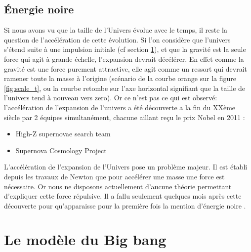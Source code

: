 \subsection{Énergie noire}
\label{sec:dark_egy}


Si nous avons vu que la taille de l'Univers évolue avec le temps, il reste la question de l'accélération de cette évolution.
Si l'on considère que l'univers s'étend suite à une impulsion initiale (cf section \ref{sec:BB}), et que la gravité est la seule force qui agit à grande échelle, l'expansion devrait décélérer.
En effet comme la gravité est une force purement attractive, elle agit comme un ressort qui devrait ramener toute la masse à l'origine (scénario de la courbe orange sur la figure \ref{fig:scale_t}, ou la courbe retombe sur l'axe horizontal signifiant que la taille de l'univers tend à nouveau vers zero).
Or ce n'est pas ce qui est observé: l'accélération de l'expansion de l'univers a été découverte a la fin du XXème siècle par 2 équipes simultanément, chacune aillant reçu le prix Nobel en 2011 :
\begin{itemize}
\item  High-Z supernovae search team \citep{1998AJ....116.1009R} %
\item  Supernova Cosmology Project \citep{1999ApJ...517..565P} %
\end{itemize}

L'accélération de l'expansion de l'Univers pose un problème majeur.
Il est établi depuis les travaux de Newton que pour accélérer une masse une force est nécessaire.
Or nous ne disposons actuellement d'aucune théorie permettant d'expliquer cette force répulsive.
Il a fallu seulement quelques mois après cette découverte pour qu’apparaisse pour la première fois la mention d'énergie noire \citep{1999PhRvD..60h1301H}.


\section{Le modèle du Big bang}
\label{sec:BB}

